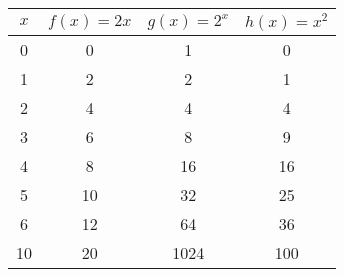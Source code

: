 \begin{center}
    \begin{tabular}{c|c|c|c}
        \( x \) & \( f(x) = 2x \) & \( g(x) = 2^x \) & \( h(x) = x^2 \) \\
        \hline
        0       & 0               & 1                & 0                \\
        1       & 2               & 2                & 1                \\
        2       & 4               & 4                & 4                \\
        3       & 6               & 8                & 9                \\
        4       & 8               & 16               & 16               \\
        5       & 10              & 32               & 25               \\
        6       & 12              & 64               & 36               \\
        10      & 20              & 1024             & 100              \\
    \end{tabular}
\end{center}

